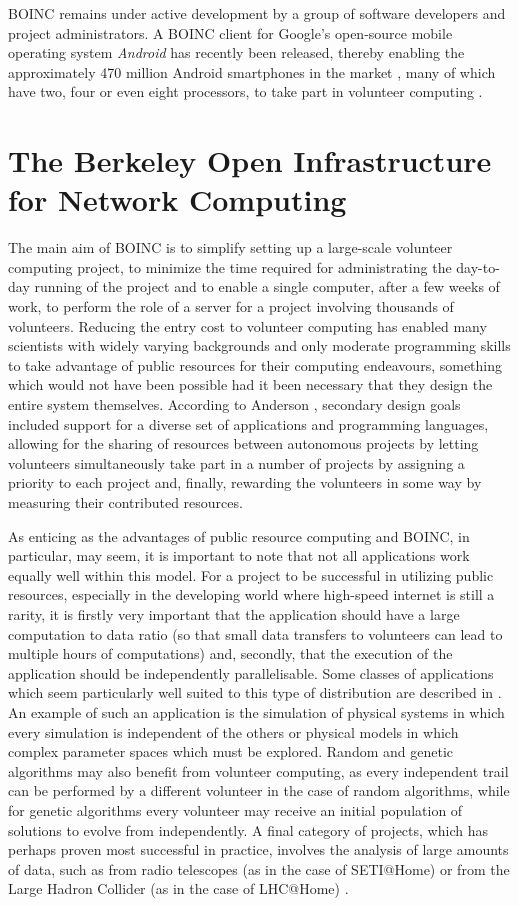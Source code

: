BOINC remains under active development by a group of software developers and project administrators. A BOINC client for Google's open-source mobile operating system \emph{Android} has recently been released, thereby enabling the approximately 470 million Android smartphones in the market \cite{mobithinking}, many of which have two, four or even eight processors,      to take part in volunteer computing \cite{android}.
\section{The Berkeley Open Infrastructure for Network Computing} \label{Boincgen}
The main aim of BOINC is to simplify setting up a large-scale volunteer computing project, to minimize the time required for administrating the day-to-day running of the project and to enable a single computer, after a few weeks of work, to perform the role of a server for a project involving thousands of volunteers. Reducing the entry cost to volunteer computing has enabled many scientists with widely varying backgrounds and only moderate programming skills to take advantage of public resources for their computing endeavours, something which would not have been possible had it been necessary that they design the entire system themselves. According to Anderson \cite{anderson2004boinc},  secondary design goals included support for a diverse set of applications and programming languages, allowing for the sharing of resources between autonomous projects by letting volunteers simultaneously take part in a number of projects by assigning a priority to each project   and, finally, rewarding the volunteers in some way by measuring their  contributed resources.

As enticing as  the advantages of public resource computing and BOINC, in particular, may seem, it is important to note that not all applications   work equally well within this model. For a project to be successful in  utilizing public resources, especially in the developing world where high-speed internet is still a rarity,  it is firstly  very important that the application  should have a large computation to data ratio (so that small data transfers to volunteers can lead to multiple hours of computations) and, secondly, that the execution of the application should be independently parallelisable. Some classes of applications which seem particularly well suited to this type of distribution are described in \cite{anderson:pc}. An example of such an application is the simulation of   physical systems  in which every simulation is independent of the others  or physical models in which complex parameter spaces which must be explored. Random and genetic algorithms may also benefit from volunteer computing, as every independent trail can be performed by a different volunteer in the case of random algorithms, while for genetic algorithms every volunteer may receive an initial population of solutions to  evolve from independently. A final category of projects, which has perhaps proven most successful in practice, involves the analysis of large amounts of data, such as from radio telescopes (as in the case of SETI@Home) or  from the Large Hadron Collider (as in the case of LHC@Home) \cite{anderson:pc}.

